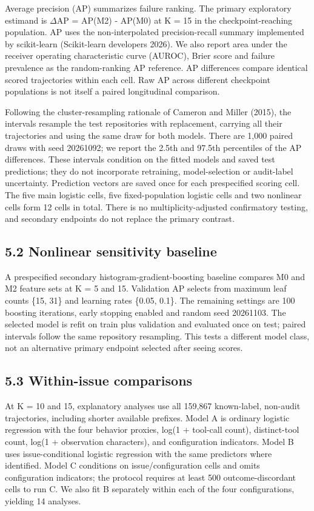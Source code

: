 \documentclass[10pt,a4paper]{article}
\begin{document}
Average precision (AP) summarizes failure ranking. The primary exploratory estimand is $\Delta$AP = AP(M2) - AP(M0) at K = 15 in the checkpoint-reaching population. AP uses the non-interpolated precision-recall summary implemented by scikit-learn (Scikit-learn developers 2026). We also report area under the receiver operating characteristic curve (AUROC), Brier score and failure prevalence as the random-ranking AP reference. AP differences compare identical scored trajectories within each cell. Raw AP across different checkpoint populations is not itself a paired longitudinal comparison.

Following the cluster-resampling rationale of Cameron and Miller (2015), the intervals resample the test repositories with replacement, carrying all their trajectories and using the same draw for both models. There are 1,000 paired draws with seed 20261092; we report the 2.5th and 97.5th percentiles of the AP differences. These intervals condition on the fitted models and saved test predictions; they do not incorporate retraining, model-selection or audit-label uncertainty. Prediction vectors are saved once for each prespecified scoring cell. The five main logistic cells, five fixed-population logistic cells and two nonlinear cells form 12 cells in total. There is no multiplicity-adjusted confirmatory testing, and secondary endpoints do not replace the primary contrast.

\subsection{5.2 Nonlinear sensitivity baseline}
A prespecified secondary histogram-gradient-boosting baseline compares M0 and M2 feature sets at K = 5 and 15. Validation AP selects from maximum leaf counts \{15, 31\} and learning rates \{0.05, 0.1\}. The remaining settings are 100 boosting iterations, early stopping enabled and random seed 20261103. The selected model is refit on train plus validation and evaluated once on test; paired intervals follow the same repository resampling. This tests a different model class, not an alternative primary endpoint selected after seeing scores.

\subsection{5.3 Within-issue comparisons}
At K = 10 and 15, explanatory analyses use all 159,867 known-label, non-audit trajectories, including shorter available prefixes. Model A is ordinary logistic regression with the four behavior proxies, log(1 + tool-call count), distinct-tool count, log(1 + observation characters), and configuration indicators. Model B uses issue-conditional logistic regression with the same predictors where identified. Model C conditions on issue/configuration cells and omits configuration indicators; the protocol requires at least 500 outcome-discordant cells to run C. We also fit B separately within each of the four configurations, yielding 14 analyses.
\end{document}
